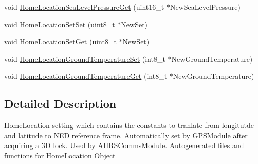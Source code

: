 \begin{DoxyCompactItemize}
\item 
void \hyperlink{group___home_location_gaa9802f96e081bb794e54f9c3de00fe56}{\-Home\-Location\-Sea\-Level\-Pressure\-Get} (uint16\-\_\-t $\ast$\-New\-Sea\-Level\-Pressure)
\item 
void \hyperlink{group___home_location_gad59721e09274fdcb2d3597688408cc4b}{\-Home\-Location\-Set\-Set} (uint8\-\_\-t $\ast$\-New\-Set)
\item 
void \hyperlink{group___home_location_ga3368295d54bcc9cb1168d04d3bf33150}{\-Home\-Location\-Set\-Get} (uint8\-\_\-t $\ast$\-New\-Set)
\item 
void \hyperlink{group___home_location_gaa2433571d939192a50e444b71cc9cce0}{\-Home\-Location\-Ground\-Temperature\-Set} (int8\-\_\-t $\ast$\-New\-Ground\-Temperature)
\item 
void \hyperlink{group___home_location_ga36f675caba06dffe6ecc7ef57c60f77e}{\-Home\-Location\-Ground\-Temperature\-Get} (int8\-\_\-t $\ast$\-New\-Ground\-Temperature)
\end{DoxyCompactItemize}


\subsection{\-Detailed \-Description}
\-Home\-Location setting which contains the constants to tranlate from longitutde and latitude to \-N\-E\-D reference frame. \-Automatically set by \-G\-P\-S\-Module after acquiring a 3\-D lock. \-Used by \-A\-H\-R\-S\-Comms\-Module. \-Autogenerated files and functions for \-Home\-Location \-Object 

